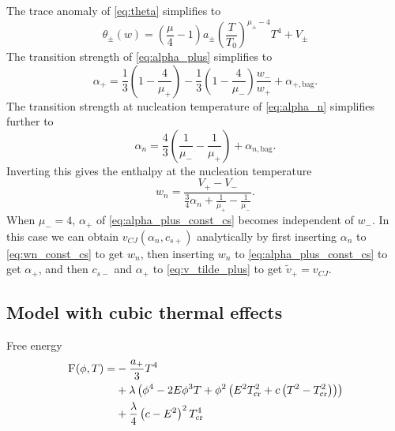 The trace anomaly of \eqref{eq:theta} simplifies to
\begin{equation}
\theta_\pm(w) = \left( \frac{\mu}{4} - 1 \right) a_\pm \left( \frac{T}{T_0} \right)^{\mu_\pm - 4} T^4 + V_\pm
\end{equation}
The transition strength of \eqref{eq:alpha_plus} simplifies to
\begin{equation}
\alpha_+ = \frac{1}{3} \left( 1 - \frac{4}{\mu_+} \right) - \frac{1}{3} \left(1 - \frac{4}{\mu_-} \right) \frac{w_-}{w_+} + \alpha_{+,\text{bag}}.
\label{eq:alpha_plus_const_cs}
\end{equation}
The transition strength at nucleation temperature of \eqref{eq:alpha_n} simplifies further to
\begin{equation}
\alpha_n = \frac{4}{3} \left( \frac{1}{\mu_-} - \frac{1}{\mu_+} \right) + \alpha_{n,\text{bag}}.
\end{equation}
Inverting this gives the enthalpy at the nucleation temperature
\begin{equation}
w_n = \frac{V_+ - V_-}{ \frac{3}{4} \alpha_n + \frac{1}{\mu_+} - \frac{1}{\mu_-} }.
\label{eq:wn_const_cs}
\end{equation}
When $\mu_- = 4$, $\alpha_+$ of \eqref{eq:alpha_plus_const_cs} becomes independent of $w_-$.
In this case we can obtain $v_{CJ}(\alpha_n, c_{s+})$ analytically by first inserting $\alpha_n$ to \eqref{eq:wn_const_cs} to get $w_n$,
then inserting $w_n$ to \eqref{eq:alpha_plus_const_cs} to get $\alpha_+$, and then $c_{s-}$ and $\alpha_+$ to \eqref{eq:v_tilde_plus} to get $\tilde{v}_+ = v_{CJ}$.

\iffalse
Now we have everything necessary to compute $\alpha_+$ and the Chapman-Jouguet speed $v_{CJ}$ analytically from $c_{s+}$, $c_{s-}$ and $\alpha_n$.
From these we get $w_n$ with \eqref{eq:wn_const_cs}, and for a detonation $w_+=w_n$.
This we can insert to \eqref{eq:wm_const_cs}, giving us $w_-$.
Now we have all the variables necessary to compute $\alpha_+$ with \eqref{eq:alpha_plus}.
Then we insert $\tilde{v}_- = c_{s-}$ to \eqref{eq:v_tilde_plus}, giving us the Chapman-Jouguet speed $v_{CJ} = v_+$.
\todo{This is wrong! We have a circular dependency and must solve the equation group at once.}
\fi


\subsection{Model with cubic thermal effects}
Free energy
\cite[eq. 45]{giese_2020}
\begin{align}
\begin{split}
\textsc{F}(\phi, T) =
&- \frac{a_+}{3} T^4 \\
&+ \lambda \left( \phi^4 - 2E\phi^3 T + \phi^2 \left( E^2 T_\text{cr}^2 + c \left( T^2 - T_\text{cr}^2 \right) \right) \right) \\
&+ \frac{\lambda}{4} \left( c - E^2 \right)^2 T_\text{cr}^4
\end{split}
\end{align}

